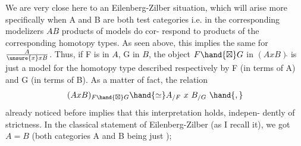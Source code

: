 We are very close here to an Eilenberg-Zilber situation, which
will arise more specifically when A and B are both \hand{\uline{\textcolor{black}{strict}}} test categories\hand{,}
i.e. in the corresponding modelizers $A\hat{}$\hand{,}$B\hat{}$ products of models do cor-%
respond to products of the corresponding homotopy types. As seen above,
this implies the same for $A\over{\unsure{x}}{x}B$. Thus, if F is in $A\hat{}$, G in $B\hat{}$, the
object $F\hand{\boxtimes} G$ in $(AxB)\hat{}$ is just a model for the homotopy type described
respectively by F (in terms of A) and G (in terms of B). As a matter
of fact, the relation
\[ (AxB)_{F\hand{\boxtimes} G} \hand{\simeq} A_{/F}\ x\ B_{/G}\ \hand{,} \]
already noticed before\hand{,} implies that this interpretation holds, indepen-%
dently of strictness. In the classical statement of Eilenberg-Zilber
(as I recall it), we got $A=B$ (both categories A and B being just \hand{$\Delta$});

